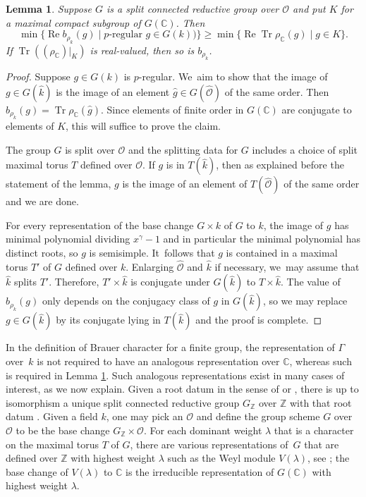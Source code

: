 \documentclass[JEP,XML,SOM,Unicode,NoFloatCountersInSection,published]{cedram}
\newtheorem{lem}[equation]{Lemma}
\theoremstyle{definition}
\newcommand{\C}{\mathbb{C}}
\newcommand{\Z}{\mathbb{Z}}
\newcommand{\mcO}{\mathcal{O}}
\let\cO\mcO
\newcommand{\cOh}{\hat{\mcO}}
\DeclareMathOperator{\RE}{Re}
\renewcommand{\Re}{\RE}
\DeclareMathOperator{\Tr}{Tr}
\newcommand{\kh}{\hat{k}}
\newcommand{\gh}{\hat{g}}
\begin{document}
\begin{lem} \label{Brauer.ineq}
Suppose $G$ is a split connected reductive group over $\cO$ and put $K$ for a maximal compact subgroup of $G(\C)$. Then
\[
\min \{\Re b_{\rho_k}(g) \mid \text{$p$-regular $g \in G(k)$})\} \ge \min \{\Re \Tr \rho_{\C}(g) \mid g \in K \}.
\]
If $\Tr((\rho_\C)\vert_K)$ is real-valued, then so is $b_{\rho_k}$.
\end{lem}

\begin{proof}
Suppose $g \in G(k)$ is $p$-regular. We~aim to show that the image of $g \in G(\kh)$ is the image of an element $\gh \in G(\cOh)$ of the same order. Then $b_{\rho_k}(g) = \Tr \rho_{\C}(\gh)$. Since elements of finite order in $G(\C)$ are conjugate to elements of $K$, this will suffice to prove the claim.

The group $G$ is split over $\cO$ and the splitting data for $G$ includes a choice of split maximal torus $T$ defined over $\cO$. If $g$ is in $T(\kh)$, then as explained before the statement of the lemma, $g$ is the image of an element of $T(\cOh)$ of the same order and we are done.

For every representation of the base change $G \times k$ of $G$ to $k$, the image of $g$ has minimal polynomial dividing $x^\gamma - 1$ and in particular the minimal polynomial has distinct roots, so $g$ is semisimple. It~follows that $g$ is contained in a maximal torus $T'$ of $G$ defined over $k$. Enlarging $\cOh$ and $\kh$ if necessary, we~may assume that $\kh$ splits $T'$. Therefore, $T' \times \kh$ is conjugate under $G(\kh)$ to $T \times \kh$. The value of $b_{\rho_k}(g)$ only depends on the conjugacy class of $g$ in $G(\kh)$, so we may replace $g \in G(\kh)$ by its conjugate lying in $T(\kh)$ and the proof is complete.
\end{proof}

In the definition of Brauer character for a finite group, the representation of $\Gamma$ over~$k$ is not required to have an analogous representation over $\C$, whereas such is required in Lemma \ref{Brauer.ineq}. Such analogous representations exist in many cases of interest, as we now explain. Given a root datum in the sense of \cite[\S{C.d}]{Milne} or \cite[\S{XXI.1.1}]{SGA3.3:new}, there is up to isomorphism a unique split connected reductive group $G_\Z$ over $\Z$ with that root datum \cite[XXV.1.2]{SGA3.3:new}. Given a field $k$, one may pick an $\cO$ and define the group scheme $G$ over $\cO$ to be the base change $G_\Z \times \cO$. For each dominant weight $\lambda$ that is a character on the maximal torus $T$ of $G$, there are various representations of~$G$ that are defined over $\Z$ with highest weight $\lambda$ such as the Weyl module $V(\lambda)$, see \cite[II.8.3]{Jantzen}; the base change of $V(\lambda)$ to $\C$ is the irreducible representation of $G(\C)$ with highest weight $\lambda$.
\end{document}

